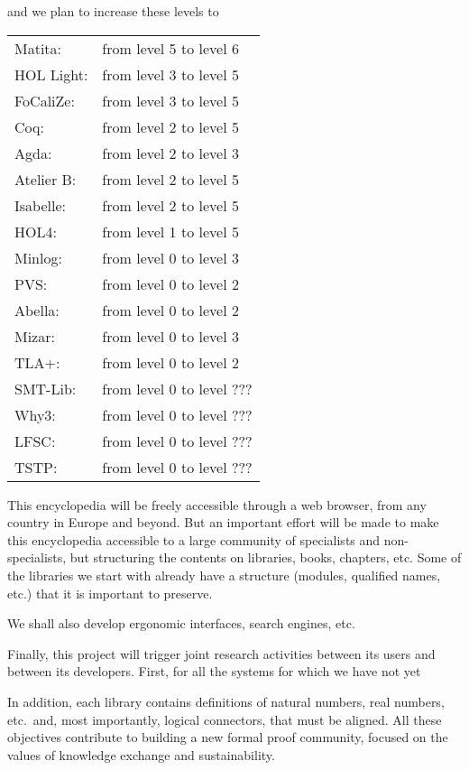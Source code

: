 and we plan to increase these levels to 

\begin{tabular}{ll}
Matita:& from level 5 to level 6\\
HOL Light:& from level 3 to level 5\\
FoCaliZe:& from level 3 to level 5\\
Coq:& from level 2 to level 5\\
Agda:& from level 2 to level 3\\
Atelier B:& from level 2 to level 5\\
Isabelle:& from level 2 to level 5\\
HOL4:& from level 1 to level 5\\
Minlog:& from level 0 to level 3\\
PVS:& from level 0 to level 2\\
Abella:& from level 0 to level 2\\
Mizar:& from level 0 to level 3\\
TLA+:& from level 0 to level 2\\
SMT-Lib:& from level 0 to level ???\\
Why3:& from level 0 to level ???\\
LFSC:& from level 0 to level ???\\
TSTP:& from level 0 to level ???\\
\end{tabular}

This encyclopedia will be freely accessible through a web browser,
from any country in Europe and beyond. But an important effort will be
made to make this encyclopedia accessible to a large community of
specialists and non-specialists, but structuring the contents on
libraries, books, chapters, etc. Some of the libraries we start with
already have a structure (modules, qualified names, etc.) that it is
important to preserve.

We shall also develop ergonomic interfaces, search engines, etc. 


Finally, this project will trigger joint research activities between
its users and between its developers.
First, for all the systems for which we have not yet





In addition, each library contains definitions of natural
numbers, real numbers, etc.\ and, most importantly, logical connectors,
that must be aligned.  All these objectives contribute to building a
new formal proof community, focused on the values of knowledge
exchange and sustainability.


